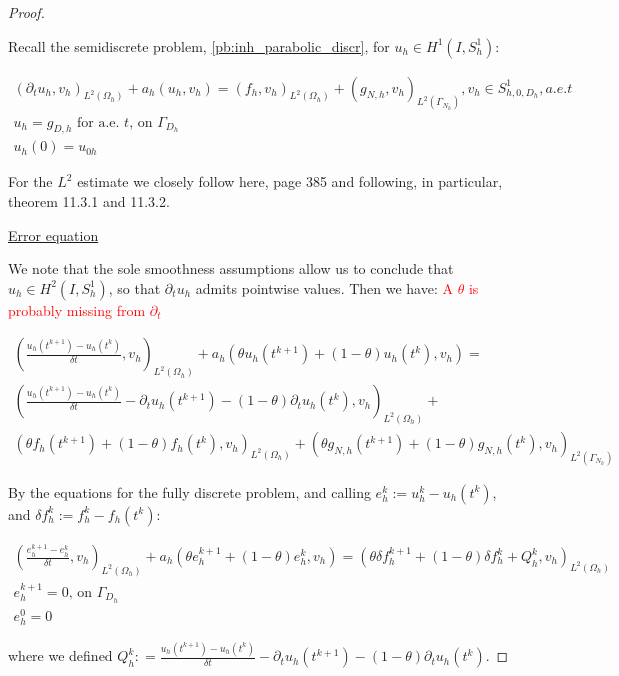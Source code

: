 \documentclass[english,a4paper,9pt,oneside]{scrbook}	%
\theoremstyle{break}
\newenvironment{mproof}[1][\proofname]{%
  \begin{proof}[#1]$ $\par\nobreak\ignorespaces
}{%
  \end{proof}
}
\renewcommand*{\proofname}{Proof}
\theoremstyle{remark}
\newcommand{\ds}{\displaystyle}
\begin{document}
\begin{appendices}
\begin{mproof}

Recall the semidiscrete problem, \cref{pb:inh_parabolic_discr}, for  $u_h \in H^1(I, S^1_h)$:
 
\begin{align*}
(\partial_t u_h, v_h)_{L^2(\Omega_h)} + a_h(u_h, v_h) = (f_h, v_h)_{L^2(\Omega_h)} + (g_{N,h}, v_h)_{L^2(\Gamma_{N_h})}, v_h \in S^1_{h,0,D_h}, a.e. t\\
u_h=g_{D,h}\text{ for a.e. }t \text{,  on } \Gamma_{D_h}\\
u_h(0)=u_{0h}
\end{align*}

For the $L^2$ estimate we closely follow \cite{quarteroni} here, page 385 and following, in particular, theorem 11.3.1 and 11.3.2.

\underline{Error equation}

We note that the sole smoothness assumptions allow us to conclude that $u_h \in H^2(I, S^1_h)$, so that $\partial_t u_h$ admits pointwise values. Then we have: \textcolor{red}{A $\theta$ is probably missing from $\partial_t$}

\begin{align*}
\left ( \frac{u_{h}(t^{k+1})-u_h(t^k)}{\delta t}, v_h\right)_{L^2(\Omega_h)} + a_h(\theta u_h(t^{k+1}) + (1-\theta) u_h(t^{k}), v_h) =\\ \left ( \frac{u_{h}(t^{k+1})-u_h(t^k)}{\delta t} - \partial_t u_h(t^{k+1}) - (1-\theta)\partial_t u_h(t^k), v_h\right)_{L^2(\Omega_h)} +\\ (\theta f_h(t^{k+1})+(1-\theta)f_h(t^{k}), v_h)_{L^2(\Omega_h)} + (\theta g_{N,h}(t^{k+1})+(1-\theta)g_{N,h}(t^{k}), v_h)_{L^2(\Gamma_{N_h})}
\end{align*}

By the equations for the fully discrete problem, and calling $e_h^k:=u_h^k-u_h(t^k)$, and $\delta f_h^k:=f_h^k-f_h(t^k)$:

\begin{align}
\label{eqn:discr_err}
\left ( \frac{e_{h}^{k+1}-e_h^k}{\delta t}, v_h\right)_{L^2(\Omega_h)} + a_h(\theta e_h^{k+1}+(1-\theta)e^k_h, v_h) = (\theta \delta f_h^{k+1}+(1-\theta)\delta f_h^k + Q_h^k, v_h)_{L^2(\Omega_h)} \\
e_h^{k+1}=0  \text{,  on } \Gamma_{D_h}\\
e_h^0=0
\end{align}

where we defined $Q_h^k:\ds =\frac{u_{h}(t^{k+1})-u_h(t^k)}{\delta t} - \partial_t u_h(t^{k+1}) - (1-\theta)\partial_tu_h(t^k)$.


\end{mproof}
\end{appendices}
\end{document}
